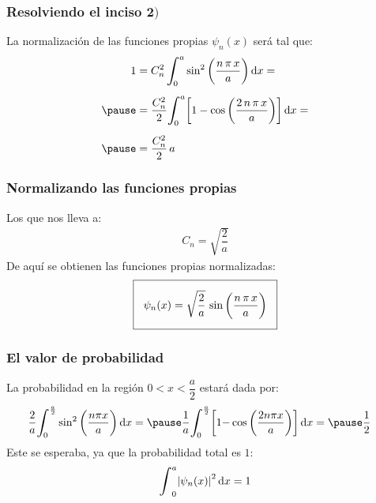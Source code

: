 \documentclass[12pt]{beamer}
\begin{document}
\begin{frame}
\frametitle{Resolviendo el inciso $\mathbf{2)}$}
La normalización de las funciones propias $\psi_{n}(x)$ será tal que:
\pause
\begin{eqnarray*}
\begin{aligned}
1 &= C_{n}^{2} \, \scaleint{6ex}_{\bs 0}^{a} \sin^{2} \bigg(\dfrac{n \, \pi \, x}{a} \bigg) \dd{x} = \\[0.5em] \pause
&= \dfrac{C_{n}^{2}}{2} \scaleint{6ex}_{\bs 0}^{a} \bigg[ 1 - \cos \bigg(\dfrac{2 \, n \, \pi \, x}{a} \bigg) \bigg] \dd{x} = \\[0.5em] \pause
&= \dfrac{C_{n}^{2}}{2} \, a
\end{aligned}
\end{eqnarray*}
\end{frame}
\begin{frame}
\frametitle{Normalizando las funciones propias}
Los que nos lleva a:
\pause
\begin{align*}
C_{n} = \sqrt{\dfrac{2}{a}}
\end{align*}
\pause
De aquí se obtienen las funciones propias normalizadas:
\pause
\begin{align*}
\setlength{\fboxsep}{3\fboxsep}\boxed{
\psi_{n}(x) = \sqrt{\dfrac{2}{a}} \, \sin \bigg(\dfrac{n \, \pi \, x}{a} \bigg) }
\end{align*}
\end{frame}
\begin{frame}
\frametitle{El valor de probabilidad}
La probabilidad en la región $0 < x < \dfrac{a}{2}$ estará dada por:
\pause
\begin{eqnarray*}
\begin{aligned}
\dfrac{2}{a} \scaleint{6ex}_{\bs 0}^{\frac{a}{2}} &\sin^{2} \bigg(\dfrac{n \pi x}{a} \bigg) \dd{x} = \pause \dfrac{1}{a} \scaleint{6ex}_{\bs 0}^{\frac{a}{2}} \bigg[ 1 {-} \cos \bigg(\dfrac{2 n \pi x}{a} \bigg) \bigg] \dd{x} = \pause \dfrac{1}{2}
\end{aligned}
\end{eqnarray*}
\pause
Este se esperaba, ya que la probabilidad total es $1$:
\begin{align*}
\scaleint{6ex}_{0}^{a} \abs{\psi_{n} (x)}^{2} \dd{x} = 1
\end{align*}
\end{frame}
\end{document}
